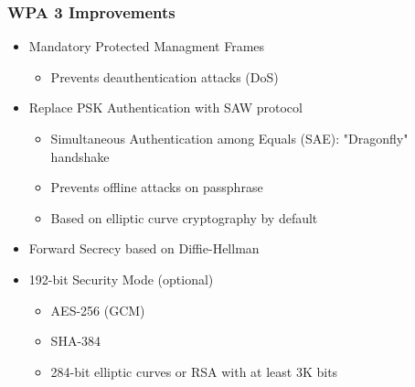 \subsubsection{WPA 3 Improvements}
\begin{itemize}
  \item Mandatory Protected Managment Frames
    \begin{itemize}
      \item Prevents deauthentication attacks (DoS)
    \end{itemize}
  \item Replace PSK Authentication with SAW protocol 
    \begin{itemize}
      \item Simultaneous Authentication among Equals (SAE):
        "Dragonfly" handshake
      \item Prevents offline attacks on passphrase 
      \item Based on elliptic curve cryptography by default
    \end{itemize}
  \item Forward Secrecy based on Diffie-Hellman 
  \item 192-bit Security Mode (optional) 
    \begin{itemize}
      \item AES-256 (GCM)
      \item SHA-384 
      \item 284-bit elliptic curves or RSA with at least 3K bits 
    \end{itemize}
\end{itemize}


